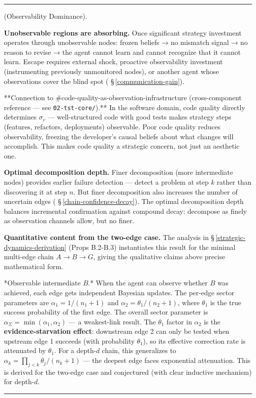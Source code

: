 \documentclass[11pt,oneside]{article}
\newcounter{claim}[section]
\renewcommand{\theclaim}{\thesection.\arabic{claim}}
\newenvironment{segment}[2]{%
  \refstepcounter{claim}%
  \bigskip\noindent\hrule\smallskip
  \noindent{\bfseries #1~\theclaim}\enskip(#2).\par\smallskip
  \noindent\ignorespaces
}{%
  \par\smallskip\noindent\hrule\bigskip
}
\newenvironment{proposition}[1][]{\begin{segment}{Proposition}{#1}}{\end{segment}}
\begin{document}
\begin{proposition}[Observability Dominance]
\textbf{Unobservable regions are absorbing.} Once significant strategy investment operates through unobservable nodes: frozen beliefs → no mismatch signal → no reason to revise → the agent cannot learn and cannot recognize that it cannot learn. Escape requires external shock, proactive observability investment (instrumenting previously unmonitored nodes), or another agent whose observations cover the blind spot ( \S\,\ref{communication-gain}).

**Connection to \#code-quality-as-observation-infrastructure (cross-component reference — see \texttt{02-tst-core/}).** In the software domain, code quality directly determines $\sigma_v$ — well-structured code with good tests makes strategy steps (features, refactors, deployments) observable. Poor code quality reduces observability, freezing the developer's causal beliefs about what changes will accomplish. This makes code quality a strategic concern, not just an aesthetic one.

\textbf{Optimal decomposition depth.} Finer decomposition (more intermediate nodes) provides earlier failure detection — detect a problem at step $k$ rather than discovering it at step $n$. But finer decomposition also increases the number of uncertain edges ( \S\,\ref{chain-confidence-decay}). The optimal decomposition depth balances incremental confirmation against compound decay: decompose as finely as observation channels allow, but no finer.

\textbf{Quantitative content from the two-edge case.} The analysis in \S\,\ref{strategic-dynamics-derivation} (Props B.2-B.3) instantiates this result for the minimal multi-edge chain $A \to B \to G$, giving the qualitative claims above precise mathematical form.

*Observable intermediate $B$.* When the agent can observe whether $B$ was achieved, each edge gets independent Bayesian updates. The per-edge sector parameters are $\alpha_1 = 1/(n_1+1)$ and $\alpha_2 = \theta_1/(n_2+1)$, where $\theta_1$ is the true success probability of the first edge. The overall sector parameter is $\alpha_\Sigma = \min(\alpha_1, \alpha_2)$ — a weakest-link result. The $\theta_1$ factor in $\alpha_2$ is the \textbf{evidence-starvation effect}: downstream edge 2 can only be tested when upstream edge 1 succeeds (with probability $\theta_1$), so its effective correction rate is attenuated by $\theta_1$. For a depth-$d$ chain, this generalizes to $\alpha_k = \prod_{j<k}\theta_j / (n_k+1)$ — the deepest edge faces exponential attenuation. This is derived for the two-edge case and conjectured (with clear inductive mechanism) for depth-$d$.


\end{proposition}
\end{document}
